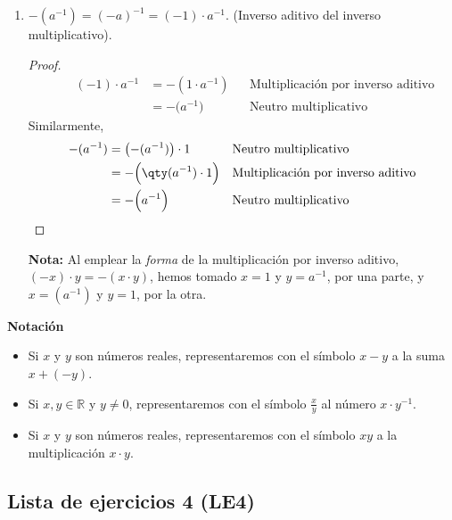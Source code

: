 \documentclass[11pt]{article}
\newcommand{\R}{\mathbb{R}}
\begin{document}
\begin{enumerate}[label=\alph*)]
\begin{enumerate}[label=\roman*)]
\pagebreak

        \item $-(a^{-1})=(-a)^{-1}=(-1)\cdot a^{-1}$. (Inverso aditivo del inverso multiplicativo).
        \begin{proof} 
        \begin{align*}
        \qquad (-1)\cdot a^{-1} &= -(1\cdot a^{-1}) && \text{Multiplicación por inverso aditivo}\\
        \qquad &= -\bigl(a^{-1}\bigr) && \text{Neutro multiplicativo}
        \end{align*}
        Similarmente,
        \begin{align*}
            -(a^{-1}) &= \bigl(-(a^{-1})\bigr) \cdot 1 && \text{Neutro multiplicativo}\\
            &= -\Bigl(\qty(a^{-1})\cdot 1\Bigr) && \text{Multiplicación por inverso aditivo}\\
            &= -\Bigl(a^{-1}\Bigr) && \text{Neutro multiplicativo} \qedhere
        \end{align*}
        \end{proof} \vspace{-1em}
        \textbf{Nota:} Al emplear la \textit{forma} de la multiplicación por inverso aditivo, $(-x)\cdot y = -(x\cdot y)$, hemos tomado $x=1$ y $y=a^{-1}$, por una parte, y $x=(a^{-1})$ y $y=1$, por la otra.
    \end{enumerate}%

\end{enumerate}

\pagebreak

\textbf{Notación}
\begin{itemize}
\item Si $x$ y $y$ son números reales, representaremos con el símbolo $x-y$ a la suma $x+(-y)$.
\item Si $x,y\in \R$ y $y\neq 0$, representaremos con el símbolo $ \frac{x}{y}$ al número $x \cdot y^{-1}$.
\item Si $x$ y $y$ son números reales, representaremos con el símbolo $xy$ a la multiplicación $x\cdot y$.
\end{itemize}

\subsection*{Lista de ejercicios 4 (LE4)}
\end{document}
